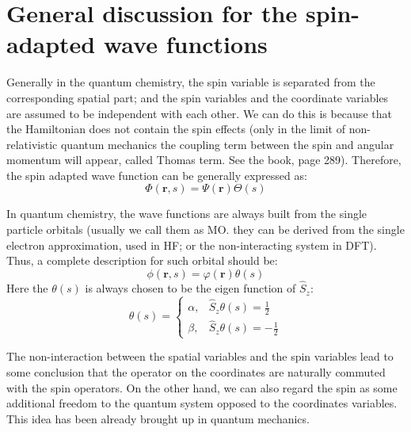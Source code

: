 \section{General discussion for the spin-adapted wave functions}
%
%
Generally in the quantum chemistry, the spin variable is separated
from the corresponding spatial part; and the spin variables and the
coordinate variables are assumed to be independent with each other.
We can do this is because that the Hamiltonian does not contain the
spin effects (only in the limit of non-relativistic quantum
mechanics the coupling term between the spin and angular momentum
will appear, called Thomas term. See the book\cite{ZengJinYan}, page
289). Therefore, the spin adapted wave function can be generally
expressed as:
\begin{equation}\label{}
\Phi(\mathbf{r}, s) = \Psi(\mathbf{r})\Theta(s)
\end{equation}

In quantum chemistry, the wave functions are always built from the
single particle orbitals (usually we call them as MO. they can be
derived from the single electron approximation, used in HF; or the
non-interacting system in DFT). Thus, a complete description for such
orbital should be:
\begin{equation}\label{}
\phi(\mathbf{r}, s) = \varphi(\mathbf{r})\theta(s)
\end{equation}
Here the $\theta(s)$ is always chosen to be the eigen function of
$\hat{S}_{z}$:
\begin{equation}\label{}
\theta(s) = \left\{
  \begin{array}{ll}
    \alpha, & \hat{S}_{z}\theta(s) =  \frac{1}{2} \\
    \beta,  & \hat{S}_{z}\theta(s) = -\frac{1}{2}
  \end{array}
\right.
\end{equation}

The non-interaction between the spatial variables and the spin
variables lead to some conclusion that the operator on the
coordinates are naturally commuted with the spin operators. On the
other hand, we can also regard the spin as some additional freedom
to the quantum system opposed to the coordinates variables. This
idea has been already brought up in quantum mechanics.


